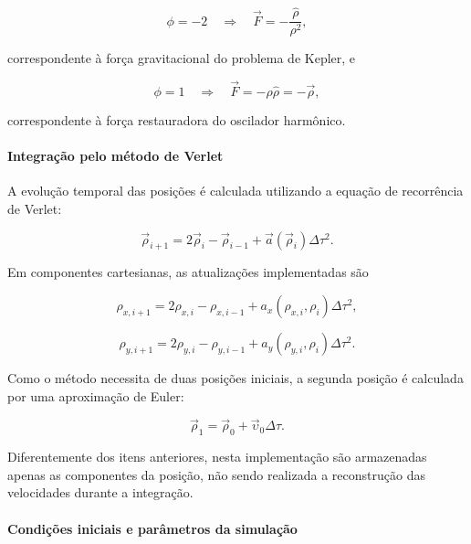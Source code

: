 \documentclass[12pt,a4paper]{article}
\begin{document}
\begin{equation}
    \phi=-2
    \quad\Longrightarrow\quad
    \vec{F}=-\frac{\hat{\rho}}{\rho^2},
\end{equation}

correspondente à força gravitacional do problema de Kepler, e

\begin{equation}
    \phi=1
    \quad\Longrightarrow\quad
    \vec{F}=-\rho\hat{\rho}=-\vec{\rho},
\end{equation}

correspondente à força restauradora do oscilador harmônico.

\paragraph{Integração pelo método de Verlet}

A evolução temporal das posições é calculada utilizando a equação de recorrência de Verlet:

\begin{equation}
    \vec{\rho}_{i+1}
    =
    2\vec{\rho}_i-\vec{\rho}_{i-1}
    +
    \vec{a}(\vec{\rho}_i)\Delta\tau^2.
\end{equation}

Em componentes cartesianas, as atualizações implementadas são

\begin{equation}
    \rho_{x,i+1}
    =
    2\rho_{x,i}-\rho_{x,i-1}
    +
    a_x(\rho_{x,i},\rho_i)\Delta\tau^2,
\end{equation}

\begin{equation}
    \rho_{y,i+1}
    =
    2\rho_{y,i}-\rho_{y,i-1}
    +
    a_y(\rho_{y,i},\rho_i)\Delta\tau^2.
\end{equation}

Como o método necessita de duas posições iniciais, a segunda posição é calculada por uma aproximação de Euler:

\begin{equation}
    \vec{\rho}_1=
    \vec{\rho}_0+\vec{\upsilon}_0\Delta\tau.
\end{equation}

Diferentemente dos itens anteriores, nesta implementação são armazenadas apenas as componentes da posição, não sendo realizada a reconstrução das velocidades durante a integração.

\paragraph{Condições iniciais e parâmetros da simulação}
\end{document}
